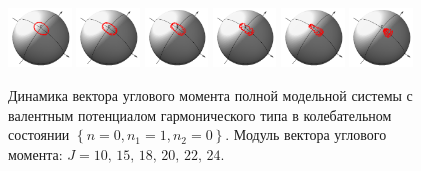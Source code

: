 \begin{figure}[H]
  \centering
	\includegraphics[width=0.15\textwidth]{../pictures/HarmGroundState10/plot_J=10.png}
	\includegraphics[width=0.15\textwidth]{../pictures/HarmGroundState10/plot_J=15.png}
	\includegraphics[width=0.15\textwidth]{../pictures/HarmGroundState10/plot_J=18.png}
	\includegraphics[width=0.15\textwidth]{../pictures/HarmGroundState10/plot_J=20.png}
	\includegraphics[width=0.15\textwidth]{../pictures/HarmGroundState10/plot_J=22.png}
	\includegraphics[width=0.15\textwidth]{../pictures/HarmGroundState10/plot_J=24.png}
	\caption{Динамика вектора углового момента полной модельной системы с валентным потенциалом гармонического типа в колебательном состоянии $\left\{ n = 0, n_1 = 1, n_2 = 0 \right\}$. Модуль вектора углового момента: $J = 10, \, 15, \, 18, \, 20, \, 22, \, 24$.}
\label{fig:harm010}
\end{figure}


